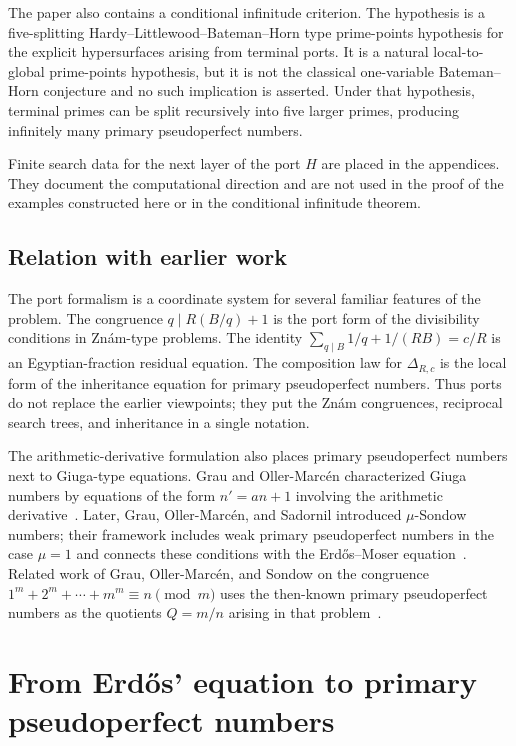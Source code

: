 \documentclass[11pt]{amsart}
\theoremstyle{plain}
\theoremstyle{definition}
\theoremstyle{remark}
\begin{document}
The paper also contains a conditional infinitude criterion.  The hypothesis is a five-splitting Hardy--Littlewood--Bateman--Horn type prime-points hypothesis for the explicit hypersurfaces arising from terminal ports.  It is a natural local-to-global prime-points hypothesis, but it is not the classical one-variable Bateman--Horn conjecture and no such implication is asserted.  Under that hypothesis, terminal primes can be split recursively into five larger primes, producing infinitely many primary pseudoperfect numbers.

Finite search data for the next layer of the port $H$ are placed in the appendices.  They document the computational direction and are not used in the proof of the examples constructed here or in the conditional infinitude theorem.

\subsection*{Relation with earlier work}
The port formalism is a coordinate system for several familiar features of the problem.  The congruence $q\mid R(B/q)+1$ is the port form of the divisibility conditions in Zn\'am-type problems.  The identity $\sum_{q\mid B}1/q+1/(RB)=c/R$ is an Egyptian-fraction residual equation.  The composition law for $\Delta_{R,c}$ is the local form of the inheritance equation for primary pseudoperfect numbers.  Thus ports do not replace the earlier viewpoints; they put the Zn\'am congruences, reciprocal search trees, and inheritance in a single notation.

The arithmetic-derivative formulation also places primary pseudoperfect numbers next to Giuga-type equations.  Grau and Oller-Marc\'en characterized Giuga numbers by equations of the form $n'=an+1$ involving the arithmetic derivative~\cite{GrauOllerGiugaDerivative}.  Later, Grau, Oller-Marc\'en, and Sadornil introduced $\mu$-Sondow numbers; their framework includes weak primary pseudoperfect numbers in the case $\mu=1$ and connects these conditions with the Erd\H{o}s--Moser equation~\cite{GrauOllerSadornilMuSondow}.  Related work of Grau, Oller-Marc\'en, and Sondow on the congruence $1^m+2^m+\cdots+m^m\equiv n\pmod{m}$ uses the then-known primary pseudoperfect numbers as the quotients $Q=m/n$ arising in that problem~\cite{GrauOllerSondowCongruence}.

\section{From Erd\H{o}s' equation to primary pseudoperfect numbers}
\end{document}
